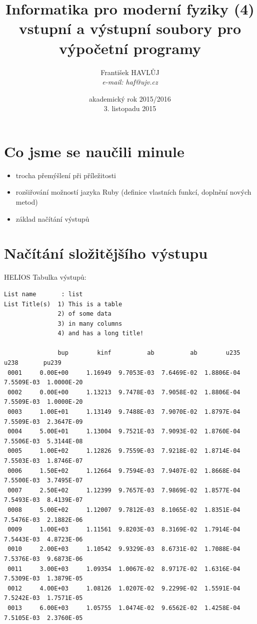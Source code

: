 \documentclass{beamer}
\title[IMF (5)]{Informatika pro moderní fyziky (4)\\vstupní a výstupní soubory pro výpočetní programy}
\author[Franti\v{s}ek HAVL\r{U}J, ORF ÚJV Řež]{Franti\v{s}ek HAVL\r{U}J\\{\scriptsize \emph{e-mail: haf@ujv.cz}}}
\date{akademický rok 2015/2016\\3. listopadu 2015}
\institute[ORF ÚJV Řež]
{ÚJV Řež\\oddělení Reaktorové fyziky a podpory palivového cyklu}
\begin{document}
\begin{frame}
  \titlepage
\end{frame}

\begin{frame}
  \tableofcontents
\end{frame}

\section{Co jsme se naučili minule}

\begin{frame}{}
  \begin{itemize}
    \item trocha přemýšlení při příležitosti 
    \item rozšiřování možností jazyka Ruby (definice vlastních funkcí, doplnění nových metod)
    \item základ načítání výstupů
  \end{itemize}
\end{frame}


\section{Načítání složitějšího výstupu}

\begin{frame}[fragile]{HELIOS}
  Tabulka výstupů:
  \scriptsize
  \begin{verbatim}
List name       : list
List Title(s)  1) This is a table
               2) of some data
               3) in many columns
               4) and has a long title!

               bup        kinf          ab          ab        u235        u238       pu239
 0001     0.00E+00     1.16949  9.7053E-03  7.6469E-02  1.8806E-04  7.5509E-03  1.0000E-20
 0002     0.00E+00     1.13213  9.7478E-03  7.9058E-02  1.8806E-04  7.5509E-03  1.0000E-20
 0003     1.00E+01     1.13149  9.7488E-03  7.9070E-02  1.8797E-04  7.5509E-03  2.3647E-09
 0004     5.00E+01     1.13004  9.7521E-03  7.9093E-02  1.8760E-04  7.5506E-03  5.3144E-08
 0005     1.00E+02     1.12826  9.7559E-03  7.9218E-02  1.8714E-04  7.5503E-03  1.8746E-07
 0006     1.50E+02     1.12664  9.7594E-03  7.9407E-02  1.8668E-04  7.5500E-03  3.7495E-07
 0007     2.50E+02     1.12399  9.7657E-03  7.9869E-02  1.8577E-04  7.5493E-03  8.4139E-07
 0008     5.00E+02     1.12007  9.7812E-03  8.1065E-02  1.8351E-04  7.5476E-03  2.1882E-06
 0009     1.00E+03     1.11561  9.8203E-03  8.3169E-02  1.7914E-04  7.5443E-03  4.8723E-06
 0010     2.00E+03     1.10542  9.9329E-03  8.6731E-02  1.7088E-04  7.5376E-03  9.6873E-06
 0011     3.00E+03     1.09354  1.0067E-02  8.9717E-02  1.6316E-04  7.5309E-03  1.3879E-05
 0012     4.00E+03     1.08126  1.0207E-02  9.2299E-02  1.5591E-04  7.5242E-03  1.7571E-05
 0013     6.00E+03     1.05755  1.0474E-02  9.6562E-02  1.4258E-04  7.5105E-03  2.3760E-05
  \end{verbatim}
\end{frame}
\end{document}
